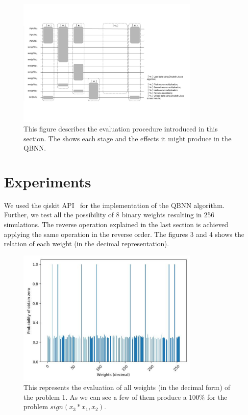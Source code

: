 \documentclass[conference]{IEEEtran}
\begin{document}
\begin{figure}[h!]
    \centering
    \includegraphics[width=9cm, scale=0.5]{images/all_circuit-converted.pdf}
    \caption{This figure describes the evaluation procedure introduced in this section.
    The shows each stage and the effects it might produce in the QBNN.}\label{Fig:Stages}
\end{figure}



\section{Experiments}\label{sec:experiments}

    We used the qiskit API~\cite{Qiskit} for the implementation of the QBNN algorithm.
    Further, we test all the possibility of 8 binary weights resulting in 256 simulations.
    The reverse operation explained in the last section is achieved applying the same operation in the reverse order.
    The figures 3 and 4 shows the relation of each weight (in the decimal representation).

    \begin{figure}[h!]
    \centering
    \includegraphics[width=9cm, scale=0.4]{images/problem_1.pdf}
    \caption{This represents the evaluation of all weights (in the decimal form) of the problem 1.
    As we can see a few of them produce a 100\% for the problem \(sign(x_3*x_1, x_2)\).}\label{Fig:problem_1}
    \end{figure}
\end{document}
